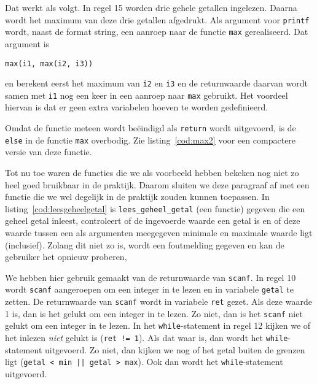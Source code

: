 
Dat werkt als volgt. In regel 15 worden drie gehele getallen ingelezen. Daarna wordt het maximum van deze drie getallen afgedrukt. Als argument voor \texttt{printf} wordt, naast de format string, een aanroep naar de functie \texttt{max} gerealiseerd. Dat argument is

\hspace*{1em}\texttt{max(i1, max(i2, i3))}

en berekent eerst het maximum van \texttt{i2} en \texttt{i3} en de returnwaarde daarvan wordt samen met \texttt{i1} nog een keer in een aanroep naar \texttt{max} gebruikt. Het voordeel hiervan is dat er geen extra variabelen hoeven te worden gedefinieerd.

Omdat de functie meteen wordt beëindigd als \texttt{return} wordt uitgevoerd, is de \texttt{else} in de functie \texttt{max} overbodig. Zie listing~\ref{cod:max2} voor een compactere versie van deze functie.


Tot nu toe waren de functies die we als voorbeeld hebben bekeken nog niet zo heel goed bruikbaar in de praktijk.
Daarom sluiten we deze paragraaf af met een functie die we wel degelijk in de praktijk zouden kunnen toepassen.
In listing~\ref{cod:leesgeheelgetal} is \texttt{lees\_geheel\_getal} (een functie) gegeven die een geheel getal inleest, controleert of de ingevoerde waarde een getal is en of deze waarde tussen een als argumenten meegegeven minimale en maximale waarde ligt (inclusief).
Zolang dit niet zo is, wordt een foutmelding gegeven en kan de gebruiker het opnieuw proberen,


We hebben hier gebruik gemaakt van de returnwaarde van \texttt{scanf}. In regel 10 wordt \texttt{scanf} aangeroepen om een integer in te lezen en in variabele \texttt{getal} te zetten. De returnwaarde van \texttt{scanf} wordt in variabele \texttt{ret} gezet. Als deze waarde 1 is, dan is het gelukt om een integer in te lezen. Zo niet, dan is het  \texttt{scanf} niet gelukt om een integer in te lezen. In het \texttt{while}-statement in regel 12 kijken we of het inlezen \textsl{niet} gelukt is (\texttt{ret != 1}). Als dat waar is, dan wordt het \texttt{while}-statement uitgevoerd. Zo niet, dan kijken we nog of het getal buiten de grenzen ligt (\texttt{getal < min || getal > max}). Ook dan wordt het \texttt{while}-statement uitgevoerd.

